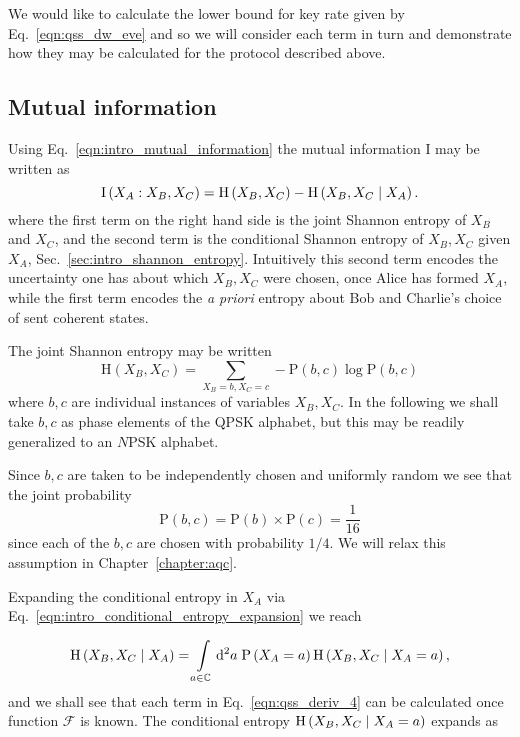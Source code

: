 We would like to calculate the lower bound for key rate given by Eq.~\ref{eqn:qss_dw_eve} and so we will consider each term in turn and demonstrate how they may be calculated for the protocol described above.



\subsection{Mutual information}

Using Eq.~\ref{eqn:intro_mutual_information} the mutual information $\text{I}$ may be written as 
\begin{equation}\label{eqn:qss_deriv_1}
\text{I}\left(X_A : X_B, X_C\right) = \text{H}\left(X_B, X_C\right) - \text{H} \left(X_B, X_C \; \middle| \; X_A\right).
\end{equation}
where the first term on the right hand side is the joint Shannon entropy of $X_B$ and $X_C$, and the second term is the conditional Shannon entropy of $X_B, X_C$ given $X_A$, Sec.~\ref{sec:intro_shannon_entropy}. Intuitively this second term encodes the uncertainty one has about which $X_B, X_C$ were chosen, once Alice has formed $X_A$, while the first term encodes the \emph{a priori} entropy about Bob and Charlie's choice of sent coherent states.

The joint Shannon entropy may be written
\begin{equation}\label{eqn:qss_deriv_2}
\text{H}\left(X_B, X_C\right) = \sum_{X_B=b, X_C=c} - \text{P}\left(b, c\right) \log \text{P}\left(b, c\right)
\end{equation}
where $b, c$ are individual instances of variables $X_B, X_C$. In the following we shall take $b, c$ as phase elements of the QPSK alphabet, but this may be readily generalized to an $N$PSK alphabet. 

Since $b, c$ are taken to be independently chosen and uniformly random we see that the joint probability
\begin{equation}\label{eqn:qss_deriv_3}
\text{P}\left(b, c\right) = \text{P}\left(b\right)\times \text{P}\left(c\right) = \frac{1}{16}
\end{equation}
since each of the $b, c$ are chosen with probability $1/4$. We will relax this assumption in Chapter~\ref{chapter:aqc}.

Expanding the conditional entropy in $X_A$ via Eq.~\ref{eqn:intro_conditional_entropy_expansion} \cite{Wilde2013} we reach

\begin{equation}\label{eqn:qss_deriv_4}
\text{H}\left(X_B, X_C \; \middle| \; X_A\right) = \int\limits_{a \in \mathbb{C}} \mathop{}\!\mathrm{d^2} a \; \text{P}\left(X_A = a\right) \text{H}\left(X_B, X_C \; \middle| \; X_A = a\right),
\end{equation}
and we shall see that each term in Eq.~\ref{eqn:qss_deriv_4} can be calculated once function $\mathcal{F}$ is known. The conditional entropy $\text{H}\left(X_B, X_C \; \middle| \; X_A = a\right)$ expands as 


